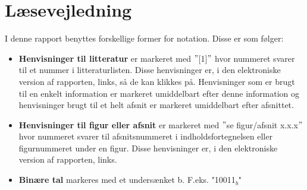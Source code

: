 \section*{Læsevejledning}
I denne rapport benyttes forskellige former for notation. Disse er som følger:

\begin{itemize}
\item \textbf{Henvisninger til litteratur} er markeret med $"$[1]$"$ hvor nummeret svarer til et nummer i litteraturlisten. Disse henvisninger er, i den elektroniske version af rapporten, links, så de kan klikkes på. Henvisninger som er brugt til en enkelt information er markeret umiddelbart efter denne information og henvisninger brugt til et helt afsnit er markeret umiddelbart efter afsnittet.

\item \textbf{Henvisninger til figur eller afsnit} er markeret med $"$se figur/afsnit x.x.x$"$ hvor nummeret svarer til afsnitsnummeret i indholdsfortegnelsen eller figurnummeret under en figur. Disse henvisninger er, i den elektroniske version af rapporten, links.

\item \textbf{Binære tal} markeres med et undersænket b. F.eks. "10011$_b$" 
\end{itemize}